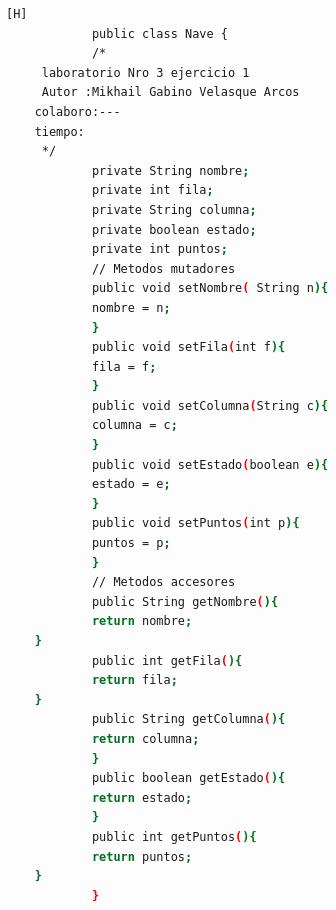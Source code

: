\documentclass{article}
\begin{document}
	\begin{lstlisting}[language=bash,caption={Creando la clase Nave}][H]
			public class Nave {
			/*
	 laboratorio Nro 3 ejercicio 1
	 Autor :Mikhail Gabino Velasque Arcos
	colaboro:---
	tiempo:
	 */
			private String nombre;
			private int fila;
			private String columna;
			private boolean estado;
			private int puntos;
			// Metodos mutadores
			public void setNombre( String n){
			nombre = n;
			}
			public void setFila(int f){
			fila = f;
			}
			public void setColumna(String c){
			columna = c;
			}
			public void setEstado(boolean e){
			estado = e;
			}
			public void setPuntos(int p){
			puntos = p;
			}
			// Metodos accesores
			public String getNombre(){
			return nombre;
	}
			public int getFila(){
			return fila;
	}
			public String getColumna(){
			return columna;
			}
			public boolean getEstado(){
			return estado;
			}
			public int getPuntos(){
			return puntos;
	}
			}
	\end{lstlisting}	
\end{document}

